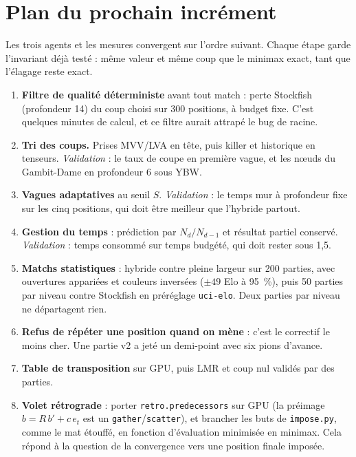 \documentclass[11pt,a4paper]{article}
\newcommand{\code}[1]{\texttt{#1}}
\begin{document}
\section{Plan du prochain incrément}
Les trois agents et les mesures convergent sur l'ordre suivant. Chaque étape garde l'invariant
déjà testé : même valeur et même coup que le minimax exact, tant que l'élagage reste exact.
\begin{enumerate}
\item \textbf{Filtre de qualité déterministe} avant tout match : perte Stockfish (profondeur 14)
du coup choisi sur 300 positions, à budget fixe. C'est quelques minutes de calcul, et ce filtre
aurait attrapé le bug de racine.
\item \textbf{Tri des coups.} Prises MVV/LVA en tête, puis killer et historique en tenseurs.
\emph{Validation} : le taux de coupe en première vague, et les nœuds du Gambit-Dame en
profondeur 6 sous YBW.
\item \textbf{Vagues adaptatives} au seuil $S$. \emph{Validation} : le temps mur à profondeur
fixe sur les cinq positions, qui doit être meilleur que l'hybride partout.
\item \textbf{Gestion du temps} : prédiction par $N_d/N_{d-1}$ et résultat partiel conservé.
\emph{Validation} : temps consommé sur temps budgété, qui doit rester sous 1{,}5.
\item \textbf{Matchs statistiques} : hybride contre pleine largeur sur 200 parties, avec
ouvertures appariées et couleurs inversées ($\pm49$ Elo à 95~\%), puis 50 parties par niveau
contre Stockfish en préréglage \code{uci-elo}. Deux parties par niveau ne départagent rien.
\item \textbf{Refus de répéter une position quand on mène} : c'est le correctif le moins cher. Une
partie v2 a jeté un demi-point avec six pions d'avance.
\item \textbf{Table de transposition} sur GPU, puis LMR et coup nul validés par des parties.
\item \textbf{Volet rétrograde} : porter \code{retro.predecessors} sur GPU (la préimage
$b=R\,b'+c\,e_t$ est un \code{gather}/\code{scatter}), et brancher les buts de \code{impose.py},
comme le mat étouffé, en fonction d'évaluation minimisée en minimax. Cela répond à la question
de la convergence vers une position finale imposée.
\end{enumerate}
\end{document}

